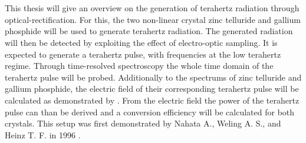 \\\\
This thesis will give an overview on the generation of terahertz radiation through optical-rectification.
For this, the two non-linear crystal zinc telluride and gallium phosphide will be used to generate terahertz radiation.
The generated radiation will then be detected by exploiting the effect of electro-optic sampling.
It is expected to generate a terahertz pulse, with frequencies at the low terahertz regime.
Through time-resolved spectroscopy the whole time domain of the terahertz pulse will be probed.
Additionally to the spectrums of zinc telluride and gallium phosphide, the electric field of their corresponding terahertz pulse will be calculated as demonstrated by \cite{THZ_eltric_field}.
From the electric field the power of the terahertz pulse can than be derived and a conversion efficiency will be calculated for both crystals.
This setup was first demonstrated by Nahata A., Weling A. S., and Heinz T. F. in 1996 \cite{ZnTe_Nahata_Weling_1996}.





